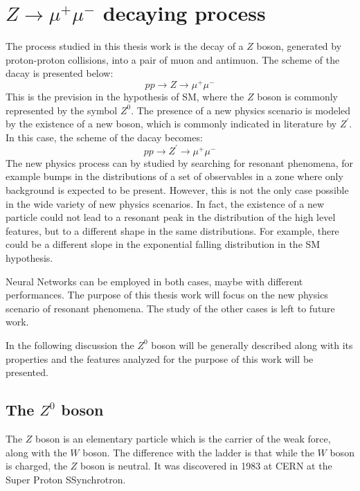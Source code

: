 \chapter{$Z \rightarrow \mu^{+}\mu^{-}$ decaying process}
\label{chap:Z}





The process studied in this thesis work is the decay of a $Z$ boson, generated by proton-proton collisions, into a pair of muon and antimuon. The scheme of the dacay is presented below:
\begin{equation}
	pp \rightarrow Z \rightarrow \mu^{+}\mu^{-}
\end{equation}
This is the prevision in the hypothesis of SM, where the $Z$ boson is commonly represented by the symbol $Z^{0}$. The presence of a new physics scenario is modeled by the existence of a new boson, which is commonly indicated in literature by $Z^{\prime}$. In this case, the scheme of the dacay becomes:
\begin{equation}
	pp \rightarrow Z^{\prime} \rightarrow \mu^{+}\mu^{-}
\end{equation}
The new physics process can by studied by searching for resonant phenomena, for example bumps in the distributions of a set of observables in a zone where only background is expected to be present. However, this is not the only case possible in the wide variety of new physics scenarios. In fact, the existence of a new particle could not lead to a resonant peak in the distribution of the high level features, but to a different shape in the same distributions. For example, there could be a different slope in the exponential falling distribution in the SM hypothesis.

Neural Networks can be employed in both cases, maybe with different performances. The purpose of this thesis work will focus on the new physics scenario of resonant phenomena. The study of the other cases is left to future work.

In the following discussion the $Z^{0}$ boson will be generally described along with its properties and the features analyzed for the purpose of this work will be presented.





\section{The $Z^{0}$ boson}
The $Z$ boson is an elementary particle which is the carrier of the weak force, along with the $W$ boson. The difference with the ladder is that while the $W$ boson is charged, the $Z$ boson is neutral. It was discovered in 1983 at CERN at the Super Proton SSynchrotron.

